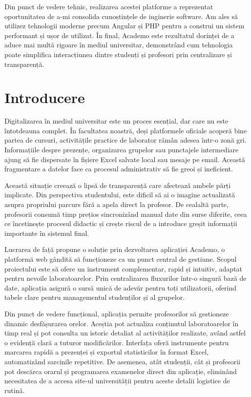 Din punct de vedere tehnic, realizarea acestei platforme a reprezentat oportunitatea de a-mi consolida 
cunoștințele de inginerie software. Am ales să utilizez tehnologii moderne precum Angular și PHP pentru 
a construi un sistem performant și ușor de utilizat. În final, Academo este rezultatul dorinței de a 
aduce mai multă rigoare în mediul universitar, demonstrând cum tehnologia poate simplifica interacțiunea 
dintre studenți și profesori prin centralizare și transparență.

\newpage

\chapter*{Introducere}

Digitalizarea în mediul universitar este un proces esențial, dar care nu este întotdeauna complet. 
În facultatea noastră, deși platformele oficiale acoperă bine partea de cursuri, activitățile 
practice de laborator rămân adesea într-o zonă gri. Informațiile despre prezențe, organizarea 
grupelor sau punctajele intermediare ajung să fie dispersate în fișiere Excel salvate local sau 
mesaje pe email. Această fragmentare a datelor face ca procesul administrativ să fie greoi și ineficient.

Această situație creează o lipsă de transparență care afectează ambele părți implicate. Din perspectiva 
studentului, este dificil să ai o imagine actualizată asupra propriului parcurs fără a apela direct 
la profesor. De cealaltă parte, profesorii consumă timp prețios sincronizând manual date din surse 
diferite, ceea ce încetinește procesul didactic și crește riscul de a introduce greșit informații 
importante în sistemul final.

Lucrarea de față propune o soluție prin dezvoltarea aplicației Academo, o platformă web gândită să 
funcționeze ca un punct central de gestiune. Scopul proiectului este să ofere un instrument complementar, 
rapid și intuitiv, adaptat pentru nevoile laboratoarelor. Prin centralizarea fluxurilor într-o singură 
bază de date, aplicația asigură o sursă unică de adevăr pentru toți utilizatorii, oferind tabele clare 
pentru managementul studenților și al grupelor.

Din punct de vedere funcțional, aplicația permite profesorilor să gestioneze dinamic desfășurarea orelor. 
Aceștia pot actualiza conținutul laboratoarelor în timp real și pot consulta un istoric detaliat al 
activităților realizate, având astfel o evidență clară a tuturor modificărilor. Interfața oferă 
instrumente pentru marcarea rapidă a prezenței și exportul statisticilor 
în format Excel, automatizând sarcinile repetitive. De asemenea, atât studenții, cât și profesorii 
pot descărca orarul și programarea examenelor direct din aplicație, eliminând necesitatea de a accesa 
site-ul universității pentru aceste detalii logistice de rutină.

